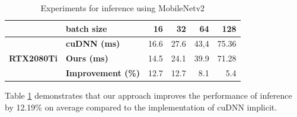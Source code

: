 \begin{table}[]
    \caption{Experiments for inference using MobileNetv2}
    \label{tab:infertime}
    \centering
    \begin{threeparttable}
    \begin{tabular}{c|l|rrrr}
    \toprule
    &\textbf{batch size} & 16& 32 &64 & 128\\
    \midrule
    \multirow{3}{*}{\textbf{RTX2080Ti}}&\textbf{cuDNN (ms)} & 16.6 & 27.6 & 43,4 &75.36 \\
    &\textbf{Ours (ms)} & 14.5  &24.1 &39.9 &71.28\\
    &\textbf{Improvement (\%)} &12.7  &12.7 &8.1 &5.4 \\
    \bottomrule
    \end{tabular}
    \footnotesize
    \end{threeparttable}
    \vspace{-5mm}
\end{table}
Table \ref{tab:infertime} demonstrates that our approach improves the performance of inference by 12.19\% on average compared to the implementation of cuDNN implicit.